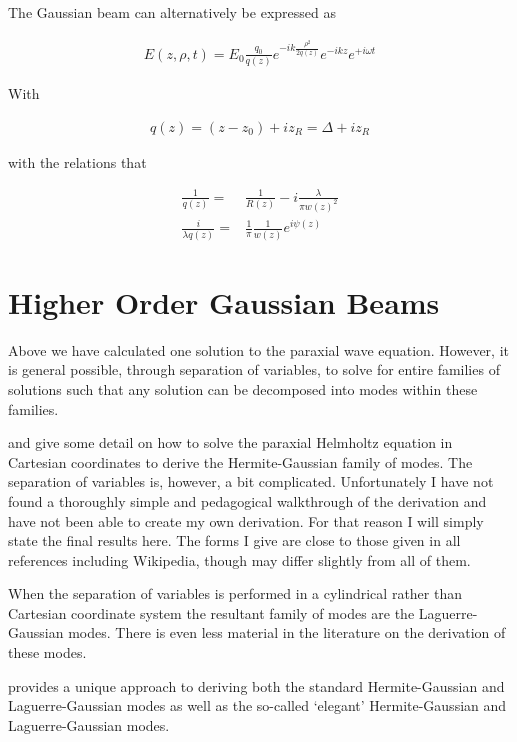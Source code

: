 \documentclass[12pt]{article}
\begin{document}
The Gaussian beam can alternatively be expressed as 

\begin{align}
E(z, \rho, t) = E_0 \frac{q_0}{q(z)} e^{-i k \frac{\rho^2}{2q(z)}} e^{-ikz} e^{+i\omega t}
\end{align}

With

\begin{align}
q(z) = (z-z_0) + i z_R = \Delta + i z_R
\end{align}

with the relations that

\begin{align}
\frac{1}{q(z)} =& \frac{1}{R(z)} - i \frac{\lambda}{\pi w(z)^2}\\
\frac{i}{\lambda q(z)} =& \frac{1}{\pi} \frac{1}{w(z)} e^{i\psi(z)}
\end{align}

\section{Higher Order Gaussian Beams}

Above we have calculated one solution to the paraxial wave equation.
However, it is general possible, through separation of variables, to solve for entire families of solutions such that any solution can be decomposed into modes within these families.

\cite{} and \cite{} give some detail on how to solve the paraxial Helmholtz equation in Cartesian coordinates to derive the Hermite-Gaussian family of modes.
The separation of variables is, however, a bit complicated.
Unfortunately I have not found a thoroughly simple and pedagogical walkthrough of the derivation and have not been able to create my own derivation.
For that reason I will simply state the final results here.
The forms I give are close to those given in all references including Wikipedia, though may differ slightly from all of them.

When the separation of variables is performed in a cylindrical rather than Cartesian coordinate system the resultant family of modes are the Laguerre-Gaussian modes.
There is even less material in the literature on the derivation of these modes.

\cite{} provides a unique approach to deriving both the standard Hermite-Gaussian and Laguerre-Gaussian modes as well as the so-called `elegant' Hermite-Gaussian and Laguerre-Gaussian modes.
\end{document}
